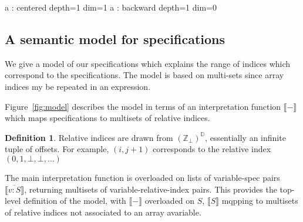 \documentclass[9pt]{sigplanconf}
\newcounter{block}
\theoremstyle{definition}
\newtheorem{definition}[block]{Definition}
\newcommand{\interp}[1]{\llbracket{#1}\rrbracket}
\begin{document}
\begin{SpecVerbatim}
a : centered depth=1 dim=1
a : backward depth=1 dim=0
\end{SpecVerbatim}

\subsection{A semantic model for specifications}
\label{sec:semantics}

\newcommand{\relix}{(\mathbb{Z}_\bot)^\mathbb{D}}

We give a model of our specifications which explains
the range of indices which correspond to the specifications.
The model is based on multi-sets since array indices my be repeated
in an expression.

Figure~\ref{fig:model} describes the model in terms of 
an interpretation function $\interp{-}$ which maps specifications
to multisets of relative indices. 

\begin{definition}Relative indices are drawn
from $(\mathbb{Z}_{\bot})^{\mathbb{D}}$, essentially an infinite
tuple of offsets. For example, $(i, j+1)$ corresponds to
the relative index $(0, 1, \bot, \bot, \ldots)$
\end{definition}

The main interpretation function is overloaded on lists of 
variable-spec pairs $\interp{\overline{v : S}}$, 
returning multisets of variable-relative-index pairs. This provides
the top-level definition of the model, with $\interp{-}$ overloaded
on $S$, $\interp{S}$ mqpping to multisets of
relative indices not associated to an array avariable.
\end{document}
